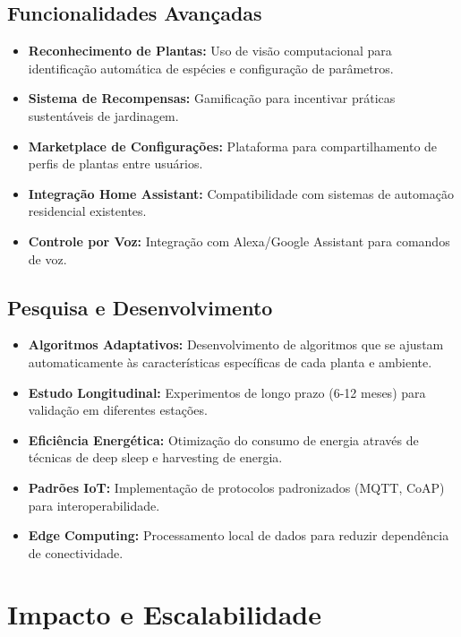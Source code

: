 \documentclass[twoside,english,brazilian]{UNISINOSmonografia}
\begin{document}
\subsection{Funcionalidades Avançadas}
\begin{itemize}
    \item \textbf{Reconhecimento de Plantas:} Uso de visão computacional para identificação automática de espécies e configuração de parâmetros.
    \item \textbf{Sistema de Recompensas:} Gamificação para incentivar práticas sustentáveis de jardinagem.
    \item \textbf{Marketplace de Configurações:} Plataforma para compartilhamento de perfis de plantas entre usuários.
    \item \textbf{Integração Home Assistant:} Compatibilidade com sistemas de automação residencial existentes.
    \item \textbf{Controle por Voz:} Integração com Alexa/Google Assistant para comandos de voz.
\end{itemize}

\subsection{Pesquisa e Desenvolvimento}
\begin{itemize}
    \item \textbf{Algoritmos Adaptativos:} Desenvolvimento de algoritmos que se ajustam automaticamente às características específicas de cada planta e ambiente.
    \item \textbf{Estudo Longitudinal:} Experimentos de longo prazo (6-12 meses) para validação em diferentes estações.
    \item \textbf{Eficiência Energética:} Otimização do consumo de energia através de técnicas de deep sleep e harvesting de energia.
    \item \textbf{Padrões IoT:} Implementação de protocolos padronizados (MQTT, CoAP) para interoperabilidade.
    \item \textbf{Edge Computing:} Processamento local de dados para reduzir dependência de conectividade.
\end{itemize}

\section{Impacto e Escalabilidade}
\end{document}
